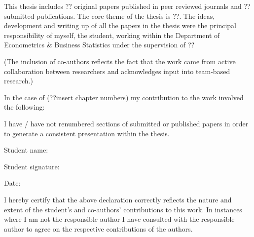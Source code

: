 \documentclass[
  11pt,
  a4paper,
]{report}
\begin{document}
This thesis includes ?? original papers published in peer reviewed
journals and ?? submitted publications. The core theme of the thesis is
??. The ideas, development and writing up of all the papers in the
thesis were the principal responsibility of myself, the student, working
within the Department of Econometrics \& Business Statistics under the
supervision of ??

(The inclusion of co-authors reflects the fact that the work came from
active collaboration between researchers and acknowledges input into
team-based research.)

In the case of (??insert chapter numbers) my contribution to the work
involved the following:

\begingroup\fontsize{10}{12}\selectfont

\endgroup{}

I have / have not renumbered sections of submitted or published papers
in order to generate a consistent presentation within the thesis.

Student name:

Student signature:

Date:

I hereby certify that the above declaration correctly reflects the
nature and extent of the student's and co-authors' contributions to this
work. In instances where I am not the responsible author I have
consulted with the responsible author to agree on the respective
contributions of the authors.
\end{document}
